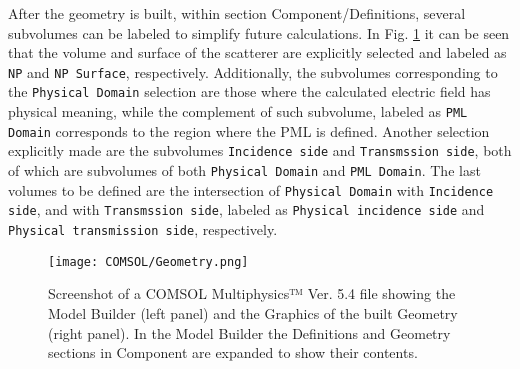 After the geometry is built, within  section Component/Definitions, several subvolumes can be labeled to simplify future calculations. In Fig. \ref{fig:COMSOL-Geo} it can be seen that the volume and surface of the scatterer are explicitly selected and labeled as \lstinline!NP! and \lstinline!NP Surface!, respectively. Additionally, the subvolumes corresponding to the \lstinline!Physical Domain! selection are those where the calculated electric field has physical meaning, while the complement of such subvolume, labeled as \lstinline!PML Domain! corresponds to the region where the PML is defined. Another selection explicitly made are the subvolumes \lstinline!Incidence side!  and \lstinline!Transmssion side!, both of which are subvolumes of both \lstinline!Physical Domain! and \lstinline!PML Domain!. The last volumes to be defined are the intersection of  \lstinline!Physical Domain! with \lstinline!Incidence side!, and with  \lstinline!Transmssion side!, labeled as \lstinline!Physical incidence side!  and \lstinline!Physical transmission side!, respectively.

\begin{figure}[t!]
    \centering
\texttt{[image: COMSOL/Geometry.png]}
\caption[COMSOl File Screenshot: Components/Definitions and Components/Geometry]{Screenshot of a COMSOL Multiphysics™ Ver. 5.4 file showing the Model Builder (left panel) and the Graphics of the built Geometry (right panel). In the Model Builder the Definitions and Geometry sections in Component are expanded to show their contents.}
\label{fig:COMSOL-Geo}
\end{figure}

